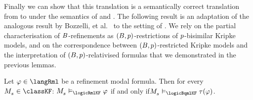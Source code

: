 Finally we can show that this translation is a semantically correct translation from \langRml{} to \langBqml{} under the semantics of \logicRmlKF{} and \logicBqmlKF{}.
The following result is an adaptation of the analogous result by Bozzelli, et al.~\cite{bozzelli:2014b} to the setting of \classKF{}.
We rely on the partial characterisation of $B$-refinements as $(B, p)$-restrictions of $p$-bisimilar Kripke models, and on the correspondence between $(B, p)$-restricted Kripke models and the interpretation of $(B, p)$-relativised formulas that we demonstrated in the previous lemmas.

\begin{theorem}\label{rml-k4-bqml-translation}
Let $\phi \in \langRml$ be a refinement modal formula.
Then for every $\kPModel{\kStateS} \in \classKF$: $\kPModel{\kStateS} \entails_\logicRmlKF \phi$ if and only if$\kPModel{\kStateS} \entails_\logicBqmlKF \tau(\phi)$.
\end{theorem}

